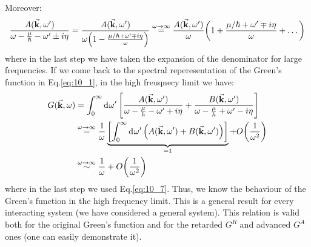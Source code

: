 \documentclass[../main/main.tex]{subfiles}
\begin{document}
Moreover:
\begin{equation*}
  \frac{A(\va{k}, \omega')}{\omega - \frac{\mu }{\hbar } - \omega' \pm i \eta }
  = \frac{A(\va{k}, \omega')}{\omega \qty( 1 - \frac{\mu/\hbar + \omega' \mp i \eta }{\omega }) }
  \overset{\omega \rightarrow \infty }{=}
  \frac{A(\va{k}, \omega')}{\omega }  \qty( 1 + \frac{\mu/\hbar + \omega' \mp i \eta }{\omega } + \dots)
\end{equation*}
where in the last step we have taken the expansion of the denominator for large frequencies.
If we come back to the spectral reperesentation of the Green's function in Eq.\eqref{eq:10_1}, in the high freuqnecy limit we have:
\begin{equation*}
  \begin{split}
  G(\va{k}, \omega ) &= \int_{0}^{\infty } \dd[]{\omega'}
  \qty[ \frac{A(\va{k},\omega' )}{\omega - \frac{\mu }{\hbar } - \omega' + i \eta  }
  +
  \frac{B(\va{k},\omega' )}{\omega - \frac{\mu }{\hbar } + \omega' - i \eta  }]\\
  & \overset{\omega \rightarrow \infty }{=}
  \frac{1}{\omega }
  \underbrace{ \qty[ \int_{0}^{\infty } \dd[]{\omega'}
   \qty( A(\va{k}, \omega' ) + B (\va{k}, \omega' ) ) ]}_{=1} + O \qty(\frac{1}{\omega ^2})  \\
  & \overset{\omega \rightarrow \infty }{\sim}   \frac{1}{\omega } + O \qty(\frac{1}{\omega ^2})
  \end{split}
\end{equation*}
where in the last step we used Eq.\eqref{eq:10_7}.
Thus, we know the behaviour of the Green's function in the high frequency limit.
This is a general result for every interacting system (we have considered a general system). This relation is valid both for the original Green's function and for the retarded \( G^R \) and advanced \( G^A \) ones (one can easily demonstrate it).
\end{document}
